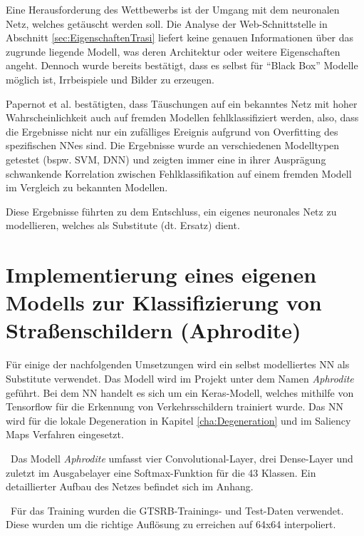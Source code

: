 \label{sec:TrasiModell}
Eine Herausforderung des Wettbewerbs ist der Umgang mit dem neuronalen Netz, welches getäuscht werden soll. Die Analyse der Web-Schnittstelle in Abschnitt \ref{sec:EigenschaftenTrasi} liefert keine genauen Informationen über das zugrunde liegende Modell, was deren Architektur oder weitere Eigenschaften angeht. Dennoch wurde bereits bestätigt, dass es selbst für "`Black Box"' Modelle möglich ist, Irrbeispiele und Bilder zu erzeugen.


Papernot et al.\cite{papernot_+_2016} bestätigten, dass Täuschungen auf ein bekanntes Netz mit hoher Wahrscheinlichkeit auch auf fremden Modellen fehlklassifiziert werden, also, dass die Ergebnisse nicht nur ein zufälliges Ereignis aufgrund von Overfitting des spezifischen \acl{NN}es sind. Die Ergebnisse wurde an verschiedenen Modelltypen getestet (bspw. \ac{SVM}, \ac{DNN}) und zeigten immer eine in ihrer Ausprägung schwankende Korrelation zwischen Fehlklassifikation auf einem fremden Modell im Vergleich zu bekannten Modellen. 


Diese Ergebnisse führten zu dem Entschluss, ein eigenes neuronales Netz zu modellieren, welches als Substitute (dt. Ersatz) dient.


\section{Implementierung eines eigenen Modells zur Klassifizierung von Straßenschildern (Aphrodite)}
\label{sec:ImplAphrodite}
Für einige der nachfolgenden Umsetzungen wird ein selbst modelliertes \ac{NN} als Substitute verwendet. Das Modell wird im Projekt unter dem Namen \textit{Aphrodite} geführt. Bei dem \ac{NN} handelt es sich um ein Keras-Modell, welches mithilfe von Tensorflow für die Erkennung von Verkehrsschildern trainiert wurde. Das \ac{NN} wird für die lokale Degeneration in Kapitel \ref{cha:Degeneration} und im Saliency Maps Verfahren eingesetzt.

~\newline Das Modell \textit{Aphrodite} umfasst vier Convolutional-Layer, drei Dense-Layer und zuletzt im Ausgabelayer eine Softmax-Funktion für die 43 Klassen. Ein detaillierter Aufbau des Netzes befindet sich im Anhang.

~\newline Für das Training wurden die \ac{GTSRB}-Trainings- und Test-Daten verwendet. Diese wurden um die richtige Auflösung zu erreichen auf 64x64 interpoliert. 

